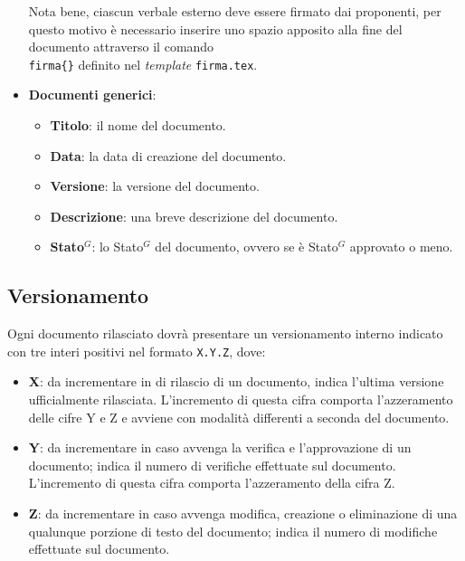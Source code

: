 \begin{itemize}
	      Nota bene, ciascun verbale esterno deve essere firmato dai proponenti,
	      per questo motivo è necessario inserire uno spazio apposito alla fine
	      del documento attraverso il comando \texttt{\\firma\{\}} definito nel
	      \textit{template} \texttt{firma.tex}.

	\item \textbf{Documenti generici}:
	      \begin{itemize}
		      \item \textbf{Titolo}: il nome del documento.
		      \item \textbf{Data}: la data di creazione del documento.
		      \item \textbf{Versione}: la versione del documento.
		      \item \textbf{Descrizione}: una breve descrizione del documento.
		      \item \textbf{\gls{Stato}$^G$}: lo \gls{Stato}$^G$ del documento, ovvero se è \gls{Stato}$^G$
		            approvato o meno.
	      \end{itemize}

\end{itemize}


\subsection{Versionamento}
\label{documentazione_versionamento}
Ogni documento rilasciato dovrà presentare un versionamento interno indicato con
tre interi positivi nel formato \texttt{X.Y.Z}, dove:
\begin{itemize}
	\item \textbf{X}: da incrementare in di rilascio di un
	      documento, indica l'ultima versione ufficialmente rilasciata.
	      L'incremento di questa cifra comporta l'azzeramento delle cifre Y e Z
	      e avviene con modalità differenti a seconda del documento.

	\item \textbf{Y}: da incrementare in caso avvenga la verifica e
	      l'approvazione di un documento; indica il numero di verifiche
	      effettuate sul documento. L'incremento di questa cifra comporta
	      l'azzeramento della cifra Z.

	\item \textbf{Z}: da incrementare in caso avvenga modifica, creazione o
	      eliminazione di una qualunque porzione di testo del documento; indica
	      il numero di modifiche effettuate sul documento.
\end{itemize}

